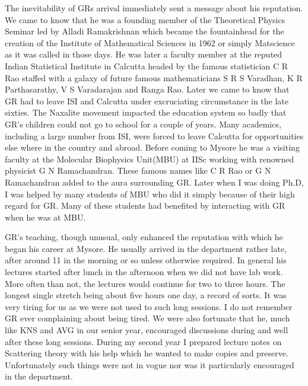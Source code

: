 The inevitability of GRs arrival immediately sent a message about his reputation. We came to know that he was a founding member of the Theoretical Physics Seminar led by Alladi Ramakrishnan which became the fountainhead for the creation of the Institute of Mathematical Sciences in 1962 or simply Matscience as it was called in those days. He was later a faculty member at the reputed Indian Statistical Institute in Calcutta headed by the famous statistician C R Rao staffed with a galaxy of future famous mathematicians S R S Varadhan, K R Parthasarathy, V S Varadarajan and Ranga Rao. Later we came to know that GR had to leave ISI and Calcutta under excruciating circumstance in the late sixties. The Naxalite movement impacted the education system so badly that GR’s children could not go to school for a couple of years. Many academics, including a large number from ISI, were forced to leave Calcutta for opportunities else where in the country and abroad. Before coming to Mysore he was a visiting faculty at the Molecular Biophysics Unit(MBU) at IISc working with renowned physicist G N Ramachandran. These famous names like C R Rao or G N Ramachandran added to the aura surrounding GR. Later when I was doing Ph.D, I was helped by many students of MBU who did it simply because of their high regard for GR. Many of these students had benefited by interacting with GR when he was at MBU.

GR’s teaching, though unusual, only enhanced the reputation with which he began his career at Mysore. He usually arrived in the department rather late, after around 11 in the morning or so unless otherwise required. In general his lectures started after lunch in the afternoon when we did not have lab work. More often than not, the lectures would continue for two to three hours. The longest single stretch being about five hours one day, a record of sorts. It was very tiring for us as we were not used to such long sessions. I do not remember GR ever complaining about being tired. We were also fortunate that he, much like KNS and AVG in our senior year, encouraged discussions during and well after these long sessions. During my second year I prepared lecture notes on Scattering theory with his help which he wanted to make copies and preserve. Unfortunately such things were not in vogue nor was it particularly encouraged in the department.


